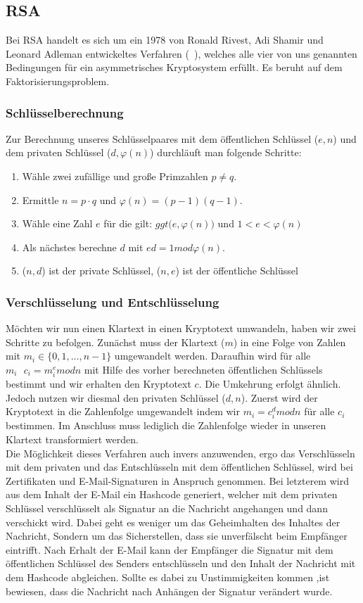 \documentclass[paper=a4,11pt,german]{scrartcl} %
\begin{document}
\subsection{RSA}
Bei RSA handelt es sich um ein 1978 von Ronald Rivest, Adi Shamir und Leonard Adleman entwickeltes Verfahren (~\cite{Eckert13}), welches   alle vier von uns genannten Bedingungen für ein asymmetrisches Kryptosystem erfüllt. Es beruht auf dem Faktorisierungsproblem.

\subsubsection{Schlüsselberechnung}
Zur Berechnung unseres Schlüsselpaares mit dem öffentlichen Schlüssel ($e,n$) und dem privaten Schlüssel ($d,\varphi(n)$) durchläuft man folgende Schritte:
\begin{enumerate}
\item Wähle zwei zufällige und große Primzahlen $p\neq q$.
\item Ermittle $n = p \cdot q$ und $\varphi(n) = (p-1)(q-1)$.
\item Wähle eine Zahl $e$ für die gilt: $ggt\Big(e,\varphi(n)\Big)$ und $1<e<\varphi(n)$
\item Als nächstes berechne $d$ mit $ed = 1 mod \varphi(n)$.
\item ($n,d$) ist der private Schlüssel, ($n,e$) ist der öffentliche Schlüssel
\end{enumerate} 

\subsubsection{Verschlüsselung und Entschlüsselung}
Möchten wir nun einen Klartext in einen Kryptotext umwandeln, haben wir zwei Schritte zu befolgen. Zunächst muss der Klartext ($m$) in eine Folge von Zahlen mit $m_i \in \{0,1,...,n-1\}$ umgewandelt werden. Daraufhin wird für alle $m_i~~~c_i=m^e_i mod n$ mit Hilfe des vorher berechneten öffentlichen Schlüssels bestimmt und wir erhalten den Kryptotext $c$. %
Die Umkehrung erfolgt ähnlich. Jedoch nutzen wir diesmal den privaten Schlüssel ($d,n$). Zuerst wird der Kryptotext in die Zahlenfolge umgewandelt indem wir $m_i = c^d_i mod n$ für alle $c_i$ bestimmen. Im Anschluss muss lediglich die Zahlenfolge wieder in unseren Klartext transformiert werden.
\ \\

Die Möglichkeit dieses Verfahren auch invers anzuwenden, ergo das Verschlüsseln mit dem privaten und das Entschlüsseln mit dem öffentlichen Schlüssel, wird bei Zertifikaten und E-Mail-Signaturen in Anspruch genommen. Bei letzterem wird aus dem Inhalt der E-Mail ein Hashcode generiert, welcher mit dem privaten Schlüssel verschlüsselt als Signatur an die Nachricht angehangen und dann verschickt wird. Dabei geht es weniger um das Geheimhalten des Inhaltes der Nachricht, Sondern um das Sicherstellen, dass sie unverfälscht beim Empfänger eintrifft. Nach Erhalt der E-Mail kann der Empfänger die Signatur mit dem öffentlichen Schlüssel des Senders entschlüsseln und den Inhalt der Nachricht mit dem Hashcode abgleichen. Sollte es dabei zu Unstimmigkeiten kommen ,ist bewiesen, dass die Nachricht nach Anhängen der Signatur verändert wurde.
\end{document}
